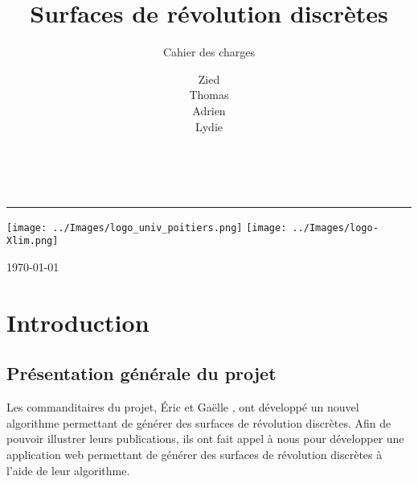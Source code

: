 \documentclass{scrartcl}
\title{Surfaces de révolution discrètes}
\subtitle{Cahier des charges}
\author{
	Zied \bsc{Ben Othmane}\\
	Thomas \bsc{Benoist}\\
	Adrien \bsc{Bisutti}\\
	Lydie \bsc{Richaume}
}
\makeatletter
\let\titleName\@title
\let\subtitleName\@subtitle
\let\authorName\@author
\makeatother
\begin{document}

\begin{titlepage}
	
	\begin{center}
		\fontsize{30}{36}\selectfont\bfseries
		\titleName\\
		\rule{6cm}{0.5pt} %
	\end{center}
	
	\begin{center}
		\LARGE
		\subtitleName
	\end{center}
	\vspace{1cm}
	
	\begin{center}
		\authorName
	\end{center}
	\vfill
	\begin{center}
		\texttt{[image: ../Images/logo\_univ\_poitiers.png]}
		\hfill
		\texttt{[image: ../Images/logo-Xlim.png]}
	\end{center}
	\vfill
	
	\begin{center}
		\today
	\end{center}
\end{titlepage}
\newpage




\tableofcontents
\newpage




\section{Introduction}


	\subsection{Présentation générale du projet}
	Les commanditaires du projet, \'Eric  et Gaëlle , ont développé un nouvel algorithme permettant de générer des surfaces de révolution discrètes. Afin de pouvoir illustrer leurs publications, ils ont fait appel à nous pour développer une application web permettant de générer des surfaces de révolution discrètes à l'aide de leur algorithme.
\end{document}
